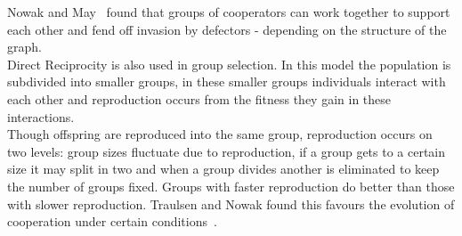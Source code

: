 \documentclass[twoside,twocolumn]{article}
\begin{document}
Nowak and May~\cite{spatial} found that groups of cooperators can work together to support each other and fend off invasion by defectors - depending on the structure of the graph.\\
Direct Reciprocity is also used in group selection. In this model the population is subdivided into smaller groups, in these smaller groups individuals interact with each other and reproduction occurs from the fitness they gain in these interactions. \\
Though offspring are reproduced into the same group, reproduction occurs on two levels: group sizes fluctuate due to reproduction, if a group gets to a certain size it may split in two and when a group divides another is eliminated to keep the number of groups fixed. Groups with faster reproduction do better than those with slower reproduction. Traulsen and Nowak found this favours the evolution of cooperation under certain conditions~\cite{multilevel_nowak}.
\end{document}

